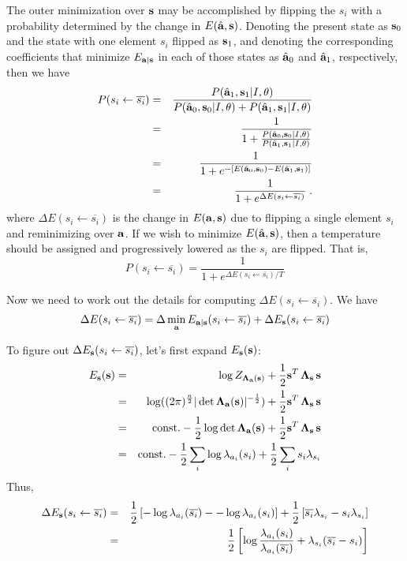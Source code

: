 \documentclass[12pt]{article}
\newcommand{\params}{\theta}
\newcommand{\ba}{{\bf a}}
\newcommand{\bah}{\hat{\bf a}}
\newcommand{\bs}{{\bf s}}
\newcommand{\bLambdas}{{\bf \Lambda_s}}
\newcommand{\bLambdaa}{{\bf \Lambda_a}}
\def\lnot{\overline}
\newcommand{\flipsi}{s_i\leftarrow\lnot{s_i}}
\begin{document}
The outer minimization over $\bs$ may be accomplished by flipping the
$s_i$ with a probability determined by the change in $E(\bah,\bs)$.
Denoting the present state as $\bs_0$ and the state with one element
$s_i$ flipped as $\bs_1$, and denoting the corresponding coefficients
that minimize $E_{\ba|\bs}$ in each of those states as $\bah_0$ and
$\bah_1$, respectively, then we have
\begin{eqnarray}
P(\flipsi) & = &
  \frac{P(\bah_1,\bs_1|I,\params)}{
        P(\bah_0,\bs_0|I,\params) + P(\bah_1,\bs_1|I,\params)} \\
 & = & \frac{1}{1 + \frac{P(\bah_0,\bs_0|I,\params)}{
                          P(\bah_1,\bs_1|I,\params)}} \\
 & = & \frac{1}{1 + e^{-[E(\bah_0,\bs_0) - E(\bah_1,\bs_1)]}} \\
 & = & \frac{1}{1 + e^{\Delta E(\flipsi)}} \; .
\label{eq:flip-rule}
\end{eqnarray}
where $\Delta E(\flipsi)$ is the change in $E(\ba,\bs)$ due to
flipping a single element $s_i$ and reminimizing over $\ba$.  If we
wish to minimize $E(\bah,\bs)$, then a temperature should be assigned
and progressively lowered as the $s_i$ are flipped.  That is,
\begin{equation}
P(\flipsi) = \frac{1}{1 + e^{\Delta E(\flipsi)/T}}
\end{equation}

\vspace{0.1in}

Now we need to work out the details for computing $\Delta E(\flipsi)$.
We have
\begin{equation}
\Delta E(\flipsi) = \Delta \min_{\ba} E_{\ba|\bs}(\flipsi) + 
                                \Delta E_{\bs}(\flipsi)
\end{equation}

To figure out $\Delta E_{\bs}(\flipsi)$, let's first expand
$E_{\bs}(\bs)$:
\begin{eqnarray}
E_{\bs}(\bs) & = & \log Z_{\bLambdaa(\bs)}
                    + \frac{1}{2} \bs^T \, \bLambdas\, \bs \\
 & = & \log((2\pi)^\frac{n}{2}|\det\bLambdaa(\bs)|^{-\frac{1}{2}})
                    + \frac{1}{2} \bs^T \, \bLambdas\, \bs \\
 & = & \mbox{const.} - \frac{1}{2}\log\det\bLambdaa(\bs) 
                    + \frac{1}{2} \bs^T \, \bLambdas\, \bs \\
 & = & \mbox{const.} - \frac{1}{2}\sum_i \log \lambda_{a_i}(s_i)
                    + \frac{1}{2} \sum_i s_i \lambda_{s_i}
\end{eqnarray}
Thus,
\begin{eqnarray}
\Delta E_{\bs}(\flipsi) & = &  \frac{1}{2} 
  \left[ -\log \lambda_{a_i}(\lnot{s_i}) - -\log \lambda_{a_i}(s_i) \right] +
  \frac{1}{2} \left[ \lnot{s_i} \lambda_{s_i} - s_i \lambda_{s_i} \right] \\
 & = & \frac{1}{2} 
 \left[ \log \frac{\lambda_{a_i}(s_i)}{\lambda_{a_i}(\lnot{s_i})}
        + \lambda_{s_i}(\lnot{s_i}-s_i) \right] 
\end{eqnarray}
\end{document}
